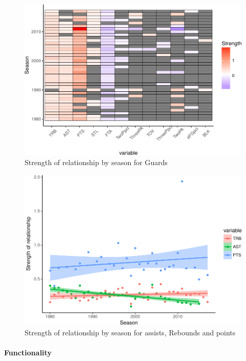 \documentclass[]{elsarticle} %
\makeatletter
\def\maxwidth{\ifdim\Gin@nat@width>\linewidth\linewidth
\else\Gin@nat@width\fi}
\let\Oldincludegraphics\includegraphics
\renewcommand{\includegraphics}[1]{\Oldincludegraphics[width=\maxwidth]{#1}}
\makeatother
\begin{document}
\begin{figure}[htbp]
\centering
\includegraphics{Coaching_Selection_files/figure-latex/unnamed-chunk-15-1.pdf}
\caption{Strength of relationship by season for Guards}
\end{figure}

\begin{figure}[htbp]
\centering
\includegraphics{Coaching_Selection_files/figure-latex/unnamed-chunk-16-1.pdf}
\caption{Strength of relationship by season for assists, Rebounds and
points}
\end{figure}

\paragraph{Functionality}\label{functionality}
\end{document}
